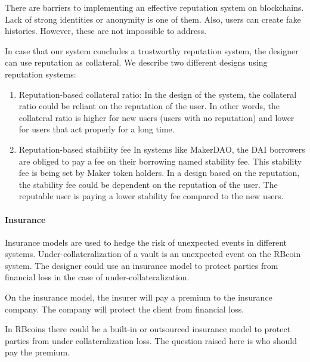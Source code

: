 There are barriers to implementing an effective reputation system on blockchains. Lack of strong identities or anonymity is one of them. Also, users can create fake histories. However, these are not impossible to address.

In case that our system concludes a trustworthy reputation system, the designer can use reputation as collateral.  We describe two different designs using reputation systems:
\begin{enumerate}
	\item Reputation-based collateral ratio: 
In the design of the system, the collateral ratio could be reliant on the reputation of the user. In other words, the collateral ratio is higher for new users (users with no reputation) and lower for users that act properly for a long time.
	\item Reputation-based staibility fee
In systems like MakerDAO, the DAI borrowers are obliged to pay a fee on their borrowing named stability fee. This stability fee is being set by Maker token holders.
	In a design based on the reputation, the stability fee could be dependent on the reputation of the user. The reputable user is paying a lower stability fee compared to the new users.
\end{enumerate}
 
\paragraph{Insurance}
Insurance models are used to hedge the risk of unexpected events in different systems. Under-collateralization of a vault is an unexpected event on the RBcoin system. The designer could use an insurance model to protect parties from financial loss in the case of under-collateralization. 

On the insurance model, the insurer will pay a premium to the insurance company. The company will protect the client from financial loss. 

In RBcoins there could be a built-in or outsourced insurance model to protect parties from under collateralization loss. The question raised here is who should pay the premium.

